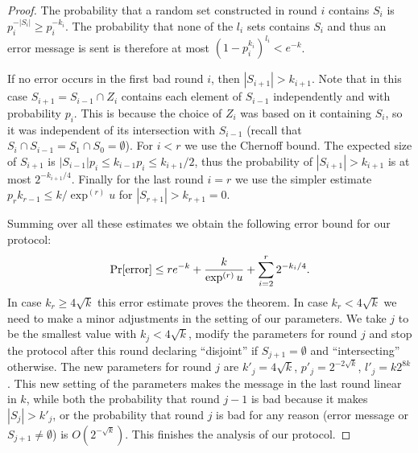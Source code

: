 \begin{proof}
The probability that a random set constructed in round $i$
contains $S_i$ is $p_i^{-|S_i|}\ge p_i^{-k_i}$. The probability
that none of the $l_i$ sets contains $S_i$ and thus an error
message is sent is therefore at most
$(1-p_i^{k_i})^{l_i}<e^{-k}$.

If no error occurs in the first bad round $i$, then
$|S_{i+1}|>k_{i+1}$. Note that in this case $S_{i+1}=S_{i-1}\cap
Z_i$ contains each element of $S_{i-1}$ independently and with
probability $p_i$. This is because the choice of $Z_i$ was based
on it containing $S_i$, so it was independent of its
intersection with $S_{i-1}$ (recall that $S_i\cap
S_{i-1}=S_1\cap S_0=\emptyset$). For $i<r$ we use the Chernoff
bound. The expected size of $S_{i+1}$ is $|S_{i-1}|p_i\le
k_{i-1}p_i\le k_{i+1}/2$, thus the probability of
$|S_{i+1}|>k_{i+1}$ is at most $2^{-k_{i+1}/4}$. Finally for the
last round $i=r$ we use the simpler estimate $p_rk_{r-1}\le
k/\exp^{(r)}u$ for $|S_{r+1}|>k_{r+1}=0$.

Summing over all these estimates we obtain the following error
bound for our protocol:
$$\Pr[\hbox{error}]\le re^{-k}+\frac k{\exp^{(r)}u}+
\sum_{i=2}^r2^{-k_i/4}.$$
In case $k_r\ge4\sqrt k$ this error estimate proves the theorem.
In case $k_r<4\sqrt k$ we need to make a minor adjustments in
the setting of our parameters. We take $j$ to be the smallest
value with $k_j<4\sqrt k$, modify the parameters for round $j$
and stop the protocol after this round declaring ``disjoint'' if
$S_{j+1}=\emptyset$ and ``intersecting'' otherwise. The new
parameters for round $j$ are $k'_j=4\sqrt k$, $p'_j=2^{-2\sqrt
k}$, $l'_j=k2^{8k}$. This new setting of the parameters makes
the message in the last round linear in $k$, while both the
probability that round $j-1$ is bad because it makes
$|S_j|>k'_j$, or the probability that round $j$ is bad for any
reason (error message or $S_{j+1}\ne\emptyset$) is $O(2^{-\sqrt
k})$. This finishes the analysis of our protocol.
\end{proof}
